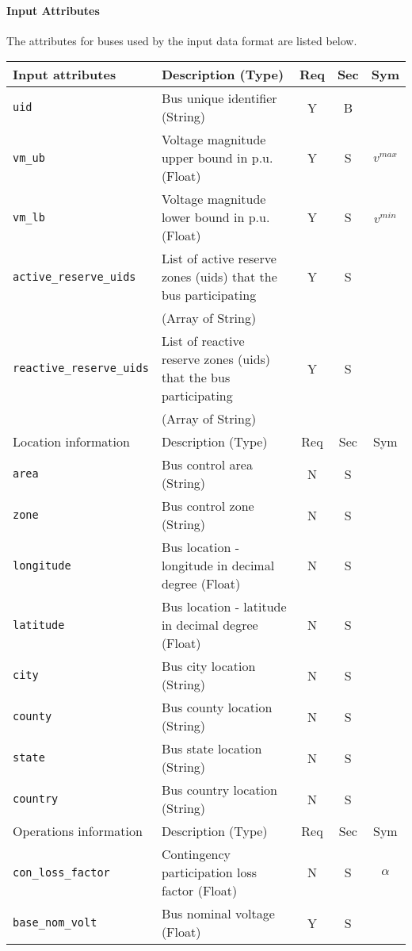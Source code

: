 \documentclass{article}
\begin{document}
\paragraph{Input Attributes} The attributes for buses used by the input data format are listed below.

\begin{center}
\small
\begin{tabular}{ l | l | c | c | c |}
Input attributes & Description (Type) & Req & Sec & Sym\\
\hline
  {\tt uid} & Bus unique identifier (String)& Y & B &  \\
  {\tt vm\_ub} & Voltage magnitude upper bound in p.u. (Float)& Y & S & $v^{max}$\\
  {\tt vm\_lb} & Voltage magnitude lower bound in p.u. (Float)& Y & S & $v^{min}$\\
  {\tt active\_reserve\_uids} & List of active reserve zones (uids) that the bus participating & Y & S & \\
                     &  (Array of String) &  & & \\
  {\tt reactive\_reserve\_uids} & List of reactive reserve zones (uids) that the bus participating & Y & S & \\
                     &  (Array of String) &  & & \\
  \hline
  Location information & Description (Type) & Req & Sec & Sym\\
  \hline
  {\tt area} &  Bus control area (String)& N & S & \\
  {\tt zone} &  Bus control zone (String)& N & S & \\
  {\tt longitude} & Bus location - longitude in decimal degree (Float) & N & S & \\
  {\tt latitude} & Bus location - latitude in decimal degree (Float) & N & S & \\
  {\tt city}     & Bus city location (String) & N & S & \\
  {\tt county}     & Bus county location (String) & N & S & \\
  {\tt state}    & Bus state location (String) & N & S & \\
  {\tt country}  & Bus country location (String) & N & S & \\
  \hline
    Operations information & Description (Type) & Req & Sec & Sym\\
  \hline
  {\tt con\_loss\_factor} & Contingency participation loss factor (Float) & N & S & $\alpha$\\
  {\tt base\_nom\_volt} & Bus nominal voltage (Float) & Y & S & \\

\end{tabular}
\end{center}
\end{document}
